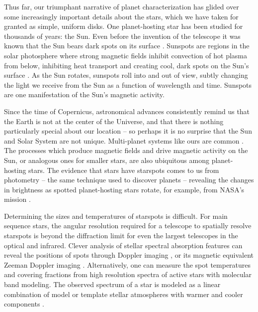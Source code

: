 Thus far, our triumphant narrative of planet characterization has glided over some increasingly important details about the stars, which we have taken for granted as simple, uniform disks. One planet-hosting star has been studied for thousands of years: the Sun. Even before the invention of the telescope it was known that the Sun bears dark spots on its surface \citep{Hayakawa2017}. Sunspots are regions in the solar photosphere where strong magnetic fields inhibit convection of hot plasma from below, inhibiting heat transport and creating cool, dark spots on the Sun's surface \citep{Solanki2003}. As the Sun rotates, sunspots roll into and out of view, subtly changing the light we receive from the Sun as a function of wavelength and time. Sunspots are one manifestation of the Sun's magnetic activity.

Since the time of Copernicus, astronomical advances consistently remind us that the Earth is not at the center of the Universe, and that there is nothing particularly special about our location \citep{Copernicus1543} -- so perhaps it is no surprise that the Sun and Solar System are not unique. Multi-planet systems like ours are common \citep{Dressing2013,Burke2015,Coughlin2016}. The processes which produce magnetic fields and drive magnetic activity on the Sun, or analogous ones for smaller stars, are also ubiquitous among planet-hosting stars. The evidence that stars have starspots comes to us from photometry -- the same technique used to discover planets -- revealing the changes in brightness as spotted planet-hosting stars rotate, for example, from NASA's \kepler mission \citep{Walkowicz2013,McQuillan2013,Giles2017}.  

Determining the sizes and temperatures of starspots is difficult. For main sequence stars, the angular resolution required for a telescope to spatially resolve starspots is beyond the diffraction limit for even the largest telescopes in the optical and infrared. Clever analysis of stellar spectral absorption features can reveal the positions of spots through Doppler imaging \citep{Vogt1983,Barnes2001,Strassmeier2002}, or its magnetic equivalent Zeeman Doppler imaging \citep{Donati2003,Morin2008,Morin2010,Morin2011,Morin2013}. Alternatively, one can measure the spot temperatures and covering fractions from high resolution spectra of active stars with molecular band modeling. The observed spectrum of a star is modeled as a linear combination of model or template stellar atmospheres with warmer and cooler components \citep{Neff1995,oneal1996,oneal1998,ONeal2004}. 

